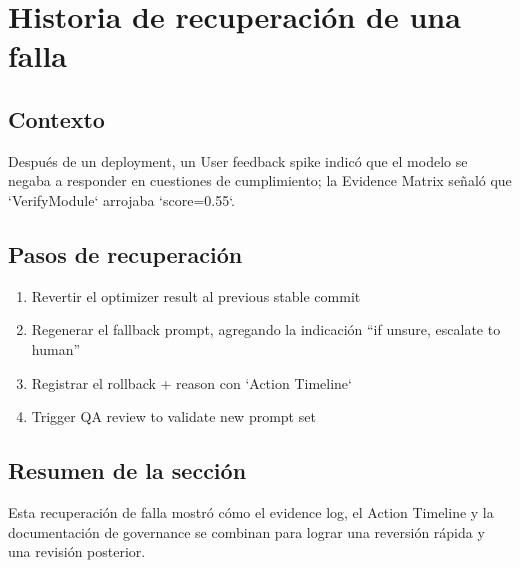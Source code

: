 \section{Historia de recuperación de una falla}

\subsection{Contexto}

Después de un deployment, un User feedback spike indicó que el modelo se negaba a responder en cuestiones de cumplimiento; la Evidence Matrix señaló que `VerifyModule` arrojaba `score=0.55`.

\subsection{Pasos de recuperación}

\begin{enumerate}
    \item Revertir el optimizer result al previous stable commit
    \item Regenerar el fallback prompt, agregando la indicación ``if unsure, escalate to human''
    \item Registrar el rollback + reason con `Action Timeline`
    \item Trigger QA review to validate new prompt set
\end{enumerate}

\subsection{Resumen de la sección}

Esta recuperación de falla mostró cómo el evidence log, el Action Timeline y la documentación de governance se combinan para lograr una reversión rápida y una revisión posterior.

